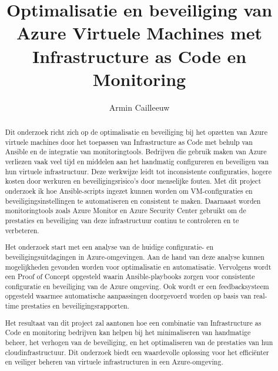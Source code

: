 \documentclass{hogent-article}
\title{Optimalisatie en beveiliging van Azure Virtuele Machines met Infrastructure as Code en Monitoring}
\author{Armin Cailleeuw}
\begin{document}
\begin{abstract}
  Dit onderzoek richt zich op de optimalisatie en beveiliging bij het opzetten van Azure virtuele machines door het toepassen van Infrastructure as Code met behulp van Ansible en de integratie van monitoringtools.
  Bedrijven die gebruik maken van Azure verliezen vaak veel tijd en middelen aan het handmatig configureren en beveiligen van hun virtuele infrastructuur. Deze werkwijze leidt tot inconsistente configuraties, hogere kosten door werkuren en beveiligingsrisico's door menselijke fouten.
  Met dit project onderzoek ik hoe Ansible-scripts ingezet kunnen worden om VM-configuraties en beveiligingsinstellingen te automatiseren en consistent te maken.
  Daarnaast worden monitoringtools zoals Azure Monitor en Azure Security Center gebruikt om de prestaties en beveiliging van deze infrastructuur continu te controleren en te verbeteren.
  
  Het onderzoek start met een analyse van de huidige configuratie- en beveiligingsuitdagingen in Azure-omgevingen. Aan de hand van deze analyse kunnen mogelijkheden gevonden worden voor optimalisatie en automatisatie.
  Vervolgens wordt een Proof of Concept opgesteld waarin Ansible-playbooks zorgen voor consistente configuratie en beveiliging van de Azure omgeving. Ook wordt er een feedbacksysteem opgesteld waarmee automatische aanpassingen doorgevoerd worden op basis van real-time prestaties en beveiligingsrapporten.
  
  Het resultaat van dit project zal aantonen hoe een combinatie van Infrastructure as Code en monitoring bedrijven kan helpen bij het minimaliseren van handmatige beheer, het verhogen van de beveiliging, en het optimaliseren van de prestaties van hun cloudinfrastructuur.
  Dit onderzoek biedt een waardevolle oplossing voor het efficiënter en veiliger beheren van virtuele infrastructuren in een Azure-omgeving.
\end{abstract}

\tableofcontents



\printbibliography[heading=bibintoc]
\end{document}
